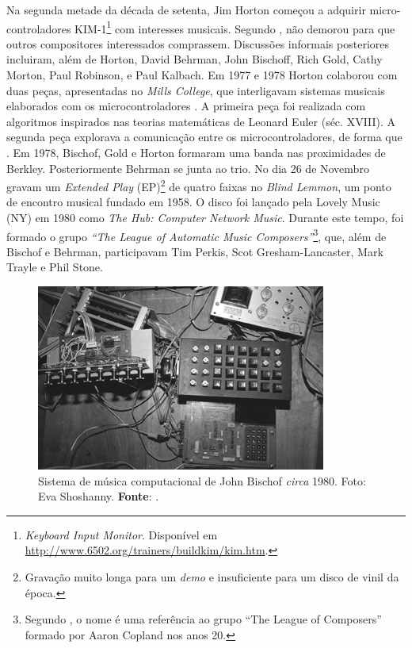 Na segunda metade da década de setenta, Jim Horton começou a adquirir micro-controladores KIM-1\footnote{\emph{Keyboard Input Monitor}. Disponível em \url{http://www.6502.org/trainers/buildkim/kim.htm}.} com interesses musicais. Segundo , não demorou para que outros compositores interessados comprassem. Discussões informais posteriores incluiram, além de Horton, David Behrman, John Bischoff, Rich Gold, Cathy Morton, Paul Robinson, e Paul Kalbach. Em 1977 e 1978  Horton colaborou com duas peças, apresentadas no \emph{Mills College}, que interligavam sistemas musicais elaborados com os microcontroladores . A primeira peça foi realizada com algoritmos inspirados nas teorias matemáticas de Leonard Euler (séc. XVIII). A segunda peça explorava a comunicação entre os microcontroladores, de forma que . Em 1978, Bischof, Gold e Horton formaram uma banda nas proximidades de Berkley. Posteriormente Behrman se junta ao trio. No dia 26 de Novembro gravam um \emph{Extended Play} (EP)\footnote{Gravação muito longa para um \emph{demo} e insuficiente para um disco de vinil da época.} de quatro faixas no \emph{Blind Lemmon}, um ponto de encontro musical fundado em 1958. O disco foi lançado pela Lovely Music (NY) em 1980 como \emph{The Hub: Computer Network Music}.  Durante este tempo, foi formado o grupo \emph{``The League of Automatic Music Composers''}\footnote{Segundo , o nome é uma referência ao grupo ``The League of Composers'' formado por Aaron Copland nos anos 20.}, que, além de  Bischof e Behrman, participavam Tim Perkis, Scot Gresham-Lancaster, Mark Trayle e Phil Stone. 

\begin{figure}[!h]
  \centering
  \includegraphics[scale=0.7]{imagens/siskim1.jpg}
  \caption{Sistema de música computacional de John Bischof \emph{circa} 1980. Foto: Eva Shoshanny\protect\footnotemark. \textbf{Fonte}: .}
  \label{fig:siskim1}
\end{figure}

